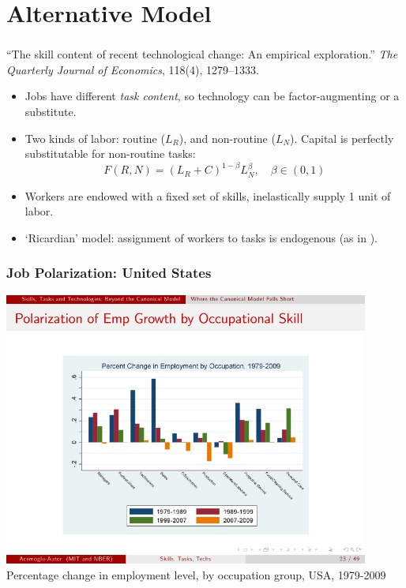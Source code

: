 \documentclass[red]{beamer}
\begin{document}
\section{Alternative Model}
\begin{frame}[fragile] %
\frametitle{\cite{Levy2003}}
``The skill content of recent technological change: An empirical exploration.'' \emph{The Quarterly Journal of Economics}, 118(4), 1279--1333.

\begin{itemize}
\item Jobs have different \emph{task content}, so technology can be factor-augmenting or a substitute.
\item Two kinds of labor: routine ($L_R$), and non-routine ($L_N$). Capital is perfectly substitutable for non-routine tasks:
$$ F(R,N) = (L_R + C)^{1-\beta}L_N^{\beta},\quad\beta\in(0,1)$$
\item Workers are endowed with a fixed set of skills, inelastically supply 1 unit of labor.
\item `Ricardian' model: assignment of workers to tasks is endogenous (as in \cite{Roy1951}).
\end{itemize}
\end{frame}

\begin{frame}
  \frametitle{Job Polarization: United States}
  \begin{center}
  \includegraphics[width=0.9\textwidth]{slides/level_by_occ.pdf} \\
  Percentage change in employment level, by occupation group, USA, 1979-2009 \citep{Acemoglu2011}
  \end{center}
\end{frame}
\end{document}
